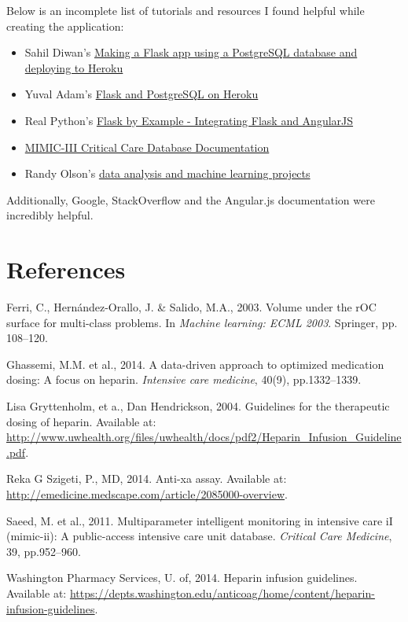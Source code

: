 \documentclass[12pt,a4paper,]{report}
\providecommand{\tightlist}{%
  \setlength{\itemsep}{0pt}\setlength{\parskip}{0pt}}
\begin{document}
Below is an incomplete list of tutorials and resources I found helpful
while creating the application:

\begin{itemize}
\tightlist
\item
  Sahil Diwan's
  \href{http://blog.sahildiwan.com/posts/flask-and-postgresql-app-deployed-on-heroku/}{Making
  a Flask app using a PostgreSQL database and deploying to Heroku}
\item
  Yuval Adam's
  \href{http://blog.y3xz.com/blog/2012/08/16/flask-and-postgresql-on-heroku}{Flask
  and PostgreSQL on Heroku}
\item
  Real Python's
  \href{https://realpython.com/blog/python/flask-by-example-integrating-flask-and-angularjs/}{Flask
  by Example - Integrating Flask and AngularJS}
\item
  \href{https://mimic.physionet.org/about/mimic/}{MIMIC-III Critical
  Care Database Documentation}
\item
  Randy Olson's
  \href{https://github.com/rhiever/Data-Analysis-and-Machine-Learning-Projects}{data
  analysis and machine learning projects}
\end{itemize}

Additionally, Google, StackOverflow and the Angular.js documentation
were incredibly helpful.

\newpage

\chapter*{References}\label{references}

\hypertarget{refs}{}
\hypertarget{ref-ferri2003volume}{}
Ferri, C., Hernández-Orallo, J. \& Salido, M.A., 2003. Volume under the
rOC surface for multi-class problems. In \emph{Machine learning: ECML
2003}. Springer, pp. 108--120.

\hypertarget{ref-ghassemi2014data}{}
Ghassemi, M.M. et al., 2014. A data-driven approach to optimized
medication dosing: A focus on heparin. \emph{Intensive care medicine},
40(9), pp.1332--1339.

\hypertarget{ref-UWHEP}{}
Lisa Gryttenholm, et a., Dan Hendrickson, 2004. Guidelines for the
therapeutic dosing of heparin. Available at:
\url{http://www.uwhealth.org/files/uwhealth/docs/pdf2/Heparin_Infusion_Guideline.pdf}.

\hypertarget{ref-phd2014}{}
Reka G Szigeti, P., MD, 2014. Anti-xa assay. Available at:
\url{http://emedicine.medscape.com/article/2085000-overview}.

\hypertarget{ref-MIMICII}{}
Saeed, M. et al., 2011. Multiparameter intelligent monitoring in
intensive care iI (mimic-ii): A public-access intensive care unit
database. \emph{Critical Care Medicine}, 39, pp.952--960.

\hypertarget{ref-universityofwashingtonpharmacyservices2014}{}
Washington Pharmacy Services, U. of, 2014. Heparin infusion guidelines.
Available at:
\url{https://depts.washington.edu/anticoag/home/content/heparin-infusion-guidelines}.
\end{document}
